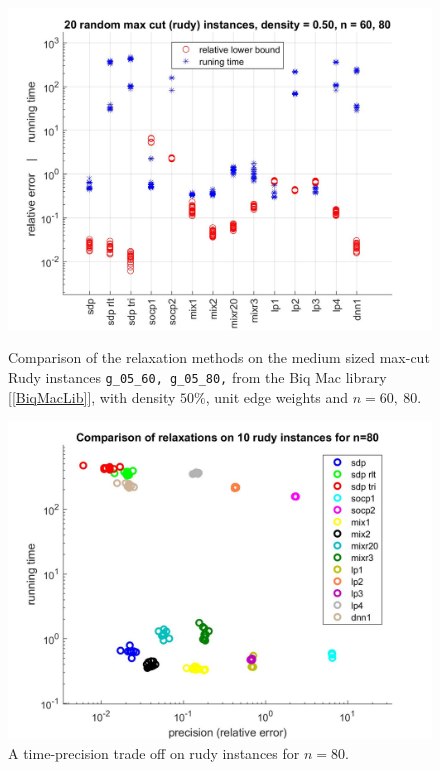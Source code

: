 \documentclass[12pt]{book}
\theoremstyle{definition}
\begin{document}
\begin{figure}
\centering
\includegraphics[scale=0.27]{img/comp1.jpg}
\caption[Comparison of relaxations - medium, dense instances of max-cut]{Comparison of the relaxation methods on the medium sized max-cut Rudy instances {\tt g\_05\_60, g\_05\_80,} from the Biq Mac library [\ref{BiqMacLib}], with density  $50\%$, unit edge weights and $n=60,\ 80$.} 
\label{comp1}
\includegraphics[scale=0.27]{img/comp1_segments.jpg}
\caption[Comparison of relaxations - a time-precision trade off]{A time-precision trade off on rudy instances for $n=80$.}
\label{comp1TradeOff}
\end{figure}
\end{document}
